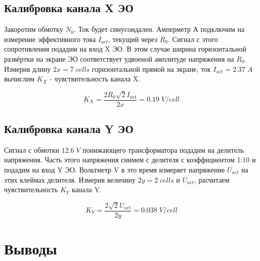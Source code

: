 \documentclass{article}
\begin{document}
\subsection{Калибровка канала X ЭО}

Закоротим обмотку \(N_0\). Ток будет синусоидален. Амперметр А подключим на измерение эффективного тока \(I_{act}\),
текущий через \(R_0\). Сигнал с этого сопротивления подадим на вход X ЭО. В этом случае ширина горизонтальной
развёртки на экране ЭО соответствует удвоеной амплитуде напряжения на \(R_0\). Измерив длину \(2x = 7\; cells\)
горизонтальной прямой на экране, ток \(I_{act} = 2.37\; A\) вычислим \(K_X\) - чувствительность канала X.

\[ K_X = \frac{2R_0\sqrt{2}I_{act}}{2x} = 0.19\; V/cell\]

\subsection{Калибровка канала Y ЭО}

Сигнал с обмотки $12.6\; V$ понижающего трансформатора подадим на делитель напряжения. Часть этого напряжения снимем
с делителя с коэффициентом 1:10 и подадим  на вход Y ЭО. Вольтметр V в это время измеряет напряжение \(U_{act}\) на
этих клеймах делителя. Измерив величину \(2y = 2\; cells\) и \(U_{act}\), расчитаем чувствительность \(K_Y\) канала Y.

\[ K_Y = \frac{2\sqrt{2}U_{act}}{2y} = 0.038\; V/cell \]

\section{Выводы}
\end{document}
